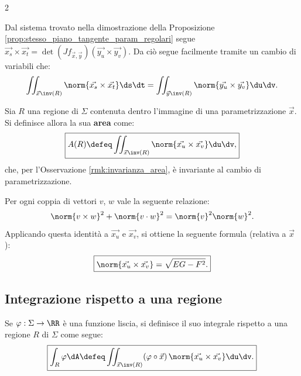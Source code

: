 \begin{multicols*}{2}
    \begin{remark} \label{rmk:invarianza_area}
        Dal sistema trovato nella dimostrazione della Proposizione \ref{prop:stesso_piano_tangente_param_regolari}
        segue $\vec{x_s} \times \vec{x_t} = \det(J f_{\vec{x}, \vec{y}}) (\vec{y_u} \times \vec{y_v})$.
        Da ciò segue facilmente tramite un cambio di variabili che:
        \[
            \iint_{\vec{x}\inv(R)} \norm{\vec{x_s} \times \vec{x_t}} \ds \dt = \iint_{\vec{y}\inv(R)} \norm{\vec{y_u} \times \vec{y_v}} \du \dv.
        \]
    \end{remark}

    \begin{definition}
        Sia $R$ una regione di $\Sigma$ contenuta dentro l'immagine
        di una parametrizzazione $\vec{x}$. Si definisce allora la sua \textbf{area}
        come:
        \[
            \boxed{A(R) \defeq \iint_{\vec{x}\inv(R)} \norm{\vec{x_u} \times \vec{x_v}} \du \dv,}
        \]
        che, per l'Osservazione \ref{rmk:invarianza_area}, è invariante al cambio
        di parametrizzazione.
    \end{definition}

    \begin{proposition}
        Per ogni coppia di vettori $v$, $w$ vale la seguente relazione:
        \[
            \norm{v \times w}^2 + \norm{v \cdot w}^2 = \norm{v}^2 \norm{w}^2.
        \]
        Applicando questa identità a $\vec{x_u}$ e $\vec{x_v}$, si ottiene
        la seguente formula (relativa a $\vec{x}$):
        \[
            \boxed{\norm{\vec{x_u} \times \vec{x_v}} = \sqrt{EG - F^2}.}
        \]
    \end{proposition}

    \subsection{Integrazione rispetto a una regione}

    \begin{definition}
        Se $\varphi : \Sigma \to \RR$ è una funzione liscia, si
        definisce il suo integrale rispetto a una regione $R$ di $\Sigma$
        come segue:
        \[
            \boxed{\int_R \varphi \dA \defeq \iint_{\vec{x}\inv(R)} (\varphi \circ \vec{x}) \, \norm{\vec{x_u} \times \vec{x_v}} \du \dv.}
        \]
    \end{definition}


\end{multicols*}
